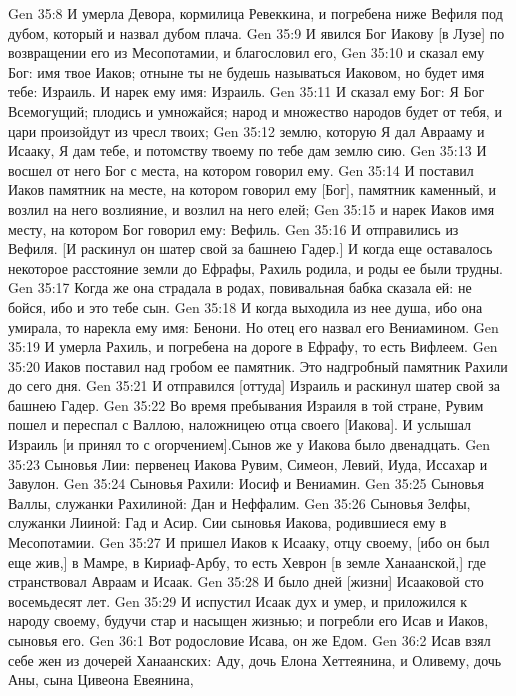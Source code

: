 \vs Gen 35:8 И умерла Девора, кормилица Ревеккина, и погребена ниже Вефиля под дубом, который и назвал  дубом плача.
\rsbpar\vs Gen 35:9 И явился Бог Иакову [в Лузе] по возвращении его из Месопотамии, и благословил его,
\vs Gen 35:10 и сказал ему Бог: имя твое Иаков; отныне ты не будешь называться Иаковом, но будет имя тебе: Израиль. И нарек ему имя: Израиль.
\vs Gen 35:11 И сказал ему Бог: Я Бог Всемогущий; плодись и умножайся; народ и множество народов будет от тебя, и цари произойдут из чресл твоих;
\vs Gen 35:12 землю, которую Я дал Аврааму и Исааку, Я дам тебе, и потомству твоему по тебе дам землю сию.
\vs Gen 35:13 И восшел от него Бог с места, на котором говорил ему.
\vs Gen 35:14 И поставил Иаков памятник на месте, на котором говорил ему [Бог], памятник каменный, и возлил на него возлияние, и возлил на него елей;
\vs Gen 35:15 и нарек Иаков имя месту, на котором Бог говорил ему: Вефиль.
\rsbpar\vs Gen 35:16 И отправились из Вефиля. [И раскинул он шатер свой за башнею Гадер.] И когда еще оставалось некоторое расстояние земли до Ефрафы, Рахиль родила, и роды ее были трудны.
\vs Gen 35:17 Когда же она страдала в родах, повивальная бабка сказала ей: не бойся, ибо и это тебе сын.
\vs Gen 35:18 И когда выходила из нее душа, ибо она умирала, то нарекла ему имя: Бенони. Но отец его назвал его Вениамином.
\vs Gen 35:19 И умерла Рахиль, и погребена на дороге в Ефрафу, то есть Вифлеем.
\vs Gen 35:20 Иаков поставил над гробом ее памятник. Это надгробный памятник Рахили до сего дня.
\vs Gen 35:21 И отправился [оттуда] Израиль и раскинул шатер свой за башнею Гадер.
\vs Gen 35:22 Во время пребывания Израиля в той стране, Рувим пошел и переспал с Валлою, наложницею отца своего [Иакова]. И услышал Израиль [и принял то с огорчением].\rsbpar Сынов же у Иакова было двенадцать.
\vs Gen 35:23 Сыновья Лии: первенец Иакова Рувим,  Симеон, Левий, Иуда, Иссахар и Завулон.
\vs Gen 35:24 Сыновья Рахили: Иосиф и Вениамин.
\vs Gen 35:25 Сыновья Валлы, служанки Рахилиной: Дан и Неффалим.
\vs Gen 35:26 Сыновья Зелфы, служанки Лииной: Гад и Асир. Сии сыновья Иакова, родившиеся ему в Месопотамии.
\rsbpar\vs Gen 35:27 И пришел Иаков к Исааку, отцу своему, [ибо он был еще жив,] в Мамре, в Кириаф-Арбу, то есть Хеврон [в земле Ханаанской,] где странствовал Авраам и Исаак.
\vs Gen 35:28 И было дней [жизни] Исааковой сто восемьдесят лет.
\vs Gen 35:29 И испустил Исаак дух и умер, и приложился к народу своему, будучи стар и насыщен жизнью; и погребли его Исав и Иаков, сыновья его.
\vs Gen 36:1 Вот родословие Исава, он же Едом.
\vs Gen 36:2 Исав взял себе жен из дочерей Ханаанских: Аду, дочь Елона Хеттеянина, и Оливему, дочь Аны, сына Цивеона Евеянина,
